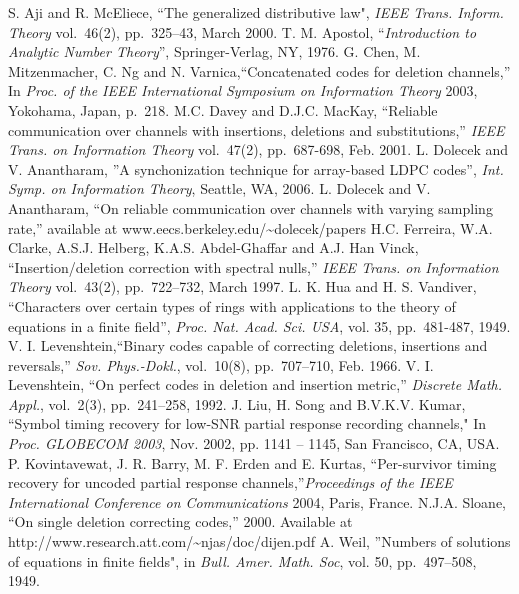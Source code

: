\begin{thebibliography}{10}
S. Aji and R. McEliece, ``The generalized distributive law",
\emph{IEEE Trans.  Inform. Theory} vol.\ 46(2), pp.~325--43, March
2000.
 T. M. Apostol, ``\emph{Introduction to Analytic Number
Theory}'', Springer-Verlag, NY, 1976.
G. Chen, M. Mitzenmacher, C. Ng and N. Varnica,``Concatenated
codes for deletion channels,'' In \emph{Proc. of the IEEE
International Symposium on Information Theory} 2003, Yokohama,
Japan, p.~218.
M.C. Davey and D.J.C. MacKay, ``Reliable communication over
channels with insertions, deletions and substitutions,''
\emph{IEEE Trans. on Information Theory} vol.\ 47(2), pp.~687-698,
Feb. 2001.
 L. Dolecek and V. Anantharam, ''A synchonization
technique for array-based LDPC codes'', \emph{Int. Symp. on
Information Theory}, Seattle, WA, 2006.
 L. Dolecek and V. Anantharam, ``On reliable communication over channels
with varying sampling rate,'' available at
www.eecs.berkeley.edu/\~{}dolecek/papers
H.C. Ferreira, W.A. Clarke, A.S.J. Helberg, K.A.S. Abdel-Ghaffar
and A.J. Han Vinck, ``Insertion/deletion correction with spectral
nulls,'' \emph{IEEE Trans. on Information Theory} vol.\ 43(2),
pp.~722--732, March 1997.
L. K. Hua and H. S. Vandiver, ``Characters over certain types of
rings with applications to the theory of equations in a finite
field'', \emph{Proc. Nat. Acad. Sci. USA}, vol. 35, pp.~481-487,
1949.
V. I. Levenshtein,``Binary codes capable of correcting deletions,
insertions and reversals,'' \emph{Sov. Phys.-Dokl.}, vol.\ 10(8),
pp.~707--710, Feb. 1966.
V. I. Levenshtein, ``On perfect codes in deletion and insertion
metric,'' \emph{Discrete Math. Appl.}, vol.\ 2(3), pp.~241--258,
1992.
J. Liu, H. Song and B.V.K.V. Kumar, ``Symbol timing recovery for
low-SNR partial response recording channels," In \emph{Proc.
GLOBECOM 2003}, Nov. 2002, pp. 1141 -- 1145, San Francisco, CA,
USA.
P. Kovintavewat, J. R. Barry, M. F. Erden and E. Kurtas,
``Per-survivor timing recovery for uncoded partial response
channels,''\emph{Proceedings of the IEEE International Conference
on Communications} 2004, Paris, France.
N.J.A. Sloane, ``On single deletion correcting codes,'' 2000.
Available at http://www.research.att.com/\~{ }njas/doc/dijen.pdf
A. Weil, ''Numbers of solutions of equations in finite fields", in
\emph{Bull. Amer. Math. Soc}, vol. 50, pp.~497--508, 1949.
\end{thebibliography}
%
